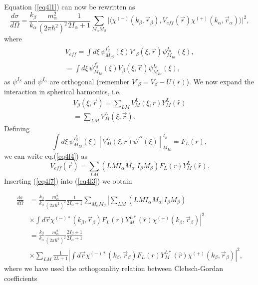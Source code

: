 \begin{subappendices}
Equation (\ref{eq4l1}) can now be rewritten as
\begin{equation}\label{eq4l3}
 \frac{d\sigma}{d\Omega}=\frac{k_\beta}{k_\alpha}\frac{m_\alpha^2}{(2 \pi \hbar^2)^2}\frac{1}{2 I_\alpha+1}\sum_{M_\alpha M_\beta}
\vert\langle
\chi^{(-)}(k_\beta,\vec{r}_\beta),V_{eff}(\vec{r}) \chi^{(+)}(k_\alpha,\vec{r}_\alpha)\rangle\vert^2,
\end{equation}
where
\begin{equation}\label{eq4l4}
\begin{split}
 V_{eff}=\int d\xi \,\psi_{M_{I\beta}}^{I_\beta^*}(\xi) V'_\beta(\xi,\vec{r}) \psi_{M_{I\alpha}}^{I_\alpha}(\xi),\\
= \int d\xi\, \psi_{M_{I\beta}}^{I_\beta^*}(\xi) V_\beta(\xi,\vec{r}) \psi_{M_{I\alpha}}^{I_\alpha}(\xi),
\end{split}
\end{equation}
 as $\psi^{I_\beta}$ and $\psi^{I_\alpha}$ are orthogonal (remember $V'_\beta=V_\beta-\bar{U}(r)$).
We now expand the interaction in spherical harmonics, i.e.
\begin{equation}\label{eq4l5}
\begin{split}
V_\beta(\xi,\vec{r}) =\sum_{LM} V_M^L(\xi,r) Y_M^L(\hat{r})\\
= \sum_{LM} V_M^L(\xi,\vec{r}).
\end{split}
\end{equation}
Defining
\begin{equation}\label{eq4l6}
 \int d\xi \,\psi_{M_{I\beta}}^{I_\beta^*}(\xi) [V_M^L(\xi,r) \psi^{I^\alpha}(\xi)]_{M_{I\beta}}^{I_\beta}
= F_L(r),
\end{equation}
we can write eq.(\ref{eq4l4}) as
\begin{equation}\label{eq4l7}
V_{eff}(\vec{r})= \sum_{LM} (LMI_\alpha M_\alpha \vert I_\beta M_\beta) F_L(r) Y_M^L(\hat{r}).
\end{equation}
Inserting (\ref{eq4l7}) into (\ref{eq4l3}) we obtain



\begin{equation}\label{eq4l8}
\begin{split}
\frac{d\sigma}{d\Omega}&=\frac{k_\beta}{k_\alpha}\frac{m_\alpha^2}{(2 \pi \hbar^2)^2}\frac{1}{2 I_\alpha+1}
\sum_{M_\alpha M_\beta}
\left\vert
\sum_{LM} (LMI_\alpha M_\alpha \vert I_\beta M_\beta) \right.\\
&\times\left.\int d\vec r \chi^{(-)*}(k_\beta,\vec{r}_\beta)
F_L(r) Y_M^{L*}(\hat{r})\chi^{(+)}(k_\beta,\vec{r}_\beta)\right\vert^2\\
&=\frac{k_\beta}{k_\alpha}\frac{m_\alpha^2}{(2 \pi \hbar^2)^2}\frac{2 I_\beta+1}{2 I_\alpha+1}\\
&\times\sum_{LM}\frac{1}{2 L+1} \left\vert \int d\vec r \chi^{(-)*}(k_\beta,\vec{r}_\beta)
F_L(r) Y_M^{L*}(\hat{r})\chi^{(+)}(k_\beta,\vec{r}_\beta)\right\vert^2,
\end{split}
\end{equation}
where we have used the orthogonality relation between Clebsch-Gordan coefficients


\end{subappendices}
